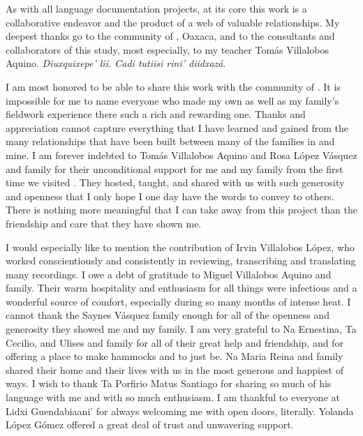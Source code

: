\begin{refsection}

As with all language documentation projects, at its core this work is a collaborative endeavor and the product of a web of valuable relationships. My deepest thanks go to the community of , Oaxaca, and to the consultants and collaborators of this study, most especially, to my teacher Tom\'{a}s Villalobos Aquino. \textit{Diuxquixepe’ lii. Cadi tutiisi rini’ diidxaz\'{a}}. 

I am most honored to be able to share this work with the community of . It is impossible for me to name everyone who made my own as well as my family’s fieldwork experience there such a rich and rewarding one. Thanks and appreciation cannot capture everything that I have learned and gained from the many relationships that have been built between many of the families in  and mine. I am forever indebted to Tom\'{a}s Villalobos Aquino and Rosa L\'{o}pez V\'{a}squez and family for their unconditional support for me and my family from the first time we visited . They hosted, taught, and shared with us with such generosity and openness that I only hope I one day have the words to convey to others. There is nothing more meaningful that I can take away from this project than the friendship and care that they have shown me.

I would especially like to mention the contribution of Irvin Villalobos L\'{o}pez, who worked conscientiously and consistently in reviewing, transcribing and translating many recordings. I owe a debt of gratitude to Miguel Villalobos Aquino and family. Their warm hospitality and enthusiasm for all things were infectious and a wonderful source of comfort, especially during so many months of intense heat. I cannot thank the Saynes V\'{a}squez family enough for all of the openness and generosity they showed me and my family. I am very grateful to Na Ernestina, Ta Cecilio, and Ulises and family for all of their great help and friendship, and for offering a place to make hammocks and to just be. Na Maria Reina and family shared their home and their lives with us in the most generous and happiest of ways. I wish to thank Ta Porfirio Matus Santiago for sharing so much of his language with me and with so much enthusiasm. I am thankful to everyone at Lidxi Guendabiaani’ for always welcoming me with open doors, literally. Yolanda L\'{o}pez G\'{o}mez offered a great deal of trust and unwavering support. 


\end{refsection}
